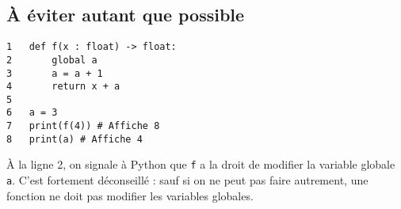 \subsection{À éviter autant que possible}



\begin{pyc}
\begin{verbatim}
1   def f(x : float) -> float:
2       global a 
3       a = a + 1
4       return x + a
5        
6   a = 3
7   print(f(4)) # Affiche 8
8   print(a) # Affiche 4       
\end{verbatim}
\end{pyc}
À la ligne 2, on signale à Python que \texttt{f} a la droit de modifier la variable globale \texttt{a}.
C'est fortement déconseillé : sauf si on ne peut pas faire autrement, une fonction ne doit pas modifier les variables globales.